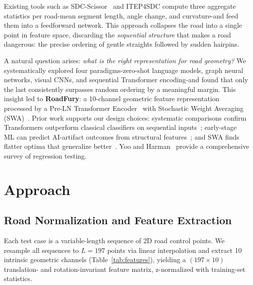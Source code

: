 ﻿\documentclass[conference]{IEEEtran}
\begin{document}
Existing tools such as SDC-Scissor~\cite{b1,b2} and ITEP4SDC compute three aggregate statistics per road-mean segment length, angle change, and curvature-and feed them into a feedforward network. This approach collapses the road into a single point in feature space, discarding the \emph{sequential structure} that makes a road dangerous: the precise ordering of gentle straights followed by sudden hairpins.

A natural question arises: \emph{what is the right representation for road geometry?} We systematically explored four paradigms-zero-shot language models, graph neural networks, visual CNNs, and sequential Transformer encoding-and found that only the last consistently surpasses random ordering by a meaningful margin. This insight led to \textbf{RoadFury}: a 10-channel geometric feature representation processed by a Pre-LN Transformer Encoder~\cite{b11} with Stochastic Weight Averaging (SWA)~\cite{b6}. Prior work supports our design choices: systematic comparisons confirm Transformers outperform classical classifiers on sequential inputs~\cite{b15}; early-stage ML can predict AI-artifact outcomes from structural features~\cite{b14}; and SWA finds flatter optima that generalize better~\cite{b6}. Yoo and Harman~\cite{b4} provide a comprehensive survey of regression testing.

\section{Approach}

\subsection{Road Normalization and Feature Extraction}

Each test case is a variable-length sequence of 2D road control points. We resample all sequences to $L{=}197$ points via linear interpolation and extract 10 intrinsic geometric channels (Table~\ref{tab:features}), yielding a $(197{\times}10)$ translation- and rotation-invariant feature matrix, z-normalized with training-set statistics.
\end{document}
